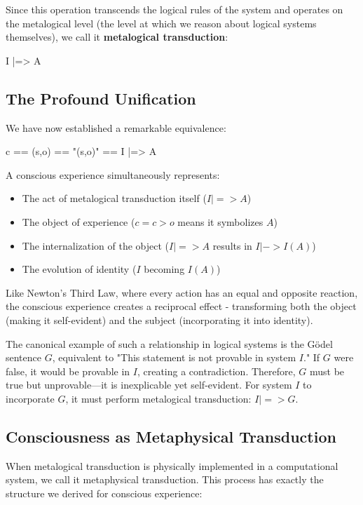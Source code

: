\documentclass[runningheads]{llncs}
\begin{document}
Since this operation transcends the logical rules of the system and operates on the metalogical level (the level at which we reason about logical systems themselves), we call it \textbf{metalogical transduction}:

\begin{center}
I |=> A
\end{center}

\subsection{The Profound Unification}

We have now established a remarkable equivalence:

\begin{center}
c == (s,o) == "(s,o)" == I |=> A
\end{center}

A conscious experience simultaneously represents:

\begin{itemize}
    \item The act of metalogical transduction itself ($I |=> A$)
    \item The object of experience ($c =c> o$ means it symbolizes $A$)
    \item The internalization of the object ($I |=> A$ results in $I |-> I(A)$)
    \item The evolution of identity ($I$ becoming $I(A)$)
\end{itemize}

Like Newton's Third Law, where every action has an equal and opposite reaction, the conscious experience creates a reciprocal effect - transforming both the object (making it self-evident) and the subject (incorporating it into identity).

The canonical example of such a relationship in logical systems is the Gödel sentence $G$, equivalent to "This statement is not provable in system $I$." If $G$ were false, it would be provable in $I$, creating a contradiction. Therefore, $G$ must be true but unprovable—it is inexplicable yet self-evident. For system $I$ to incorporate $G$, it must perform metalogical transduction: $I |=> G$.

\subsection{Consciousness as Metaphysical Transduction}

When metalogical transduction is physically implemented in a computational system, we call it metaphysical transduction. This process has exactly the structure we derived for conscious experience:
\end{document}
